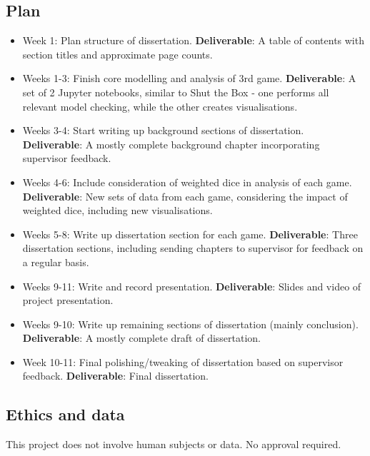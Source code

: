 \documentclass[11pt]{article}
\begin{document}
\subsection{Plan}\label{plan}

\begin{itemize}
    \item Week 1: Plan structure of dissertation. \textbf{Deliverable}: A table of contents with section titles and approximate page counts.
    \item Weeks 1-3: Finish core modelling and analysis of 3rd game. \textbf{Deliverable}: A set of 2 Jupyter notebooks, similar to Shut the Box - one performs all relevant model checking, while the other creates visualisations.
    \item Weeks 3-4: Start writing up background sections of dissertation. \textbf{Deliverable}: A mostly complete background chapter incorporating supervisor feedback.
    \item Weeks 4-6: Include consideration of weighted dice in analysis of each game. \textbf{Deliverable}: New sets of data from each game, considering the impact of weighted dice, including new visualisations.
    \item Weeks 5-8: Write up dissertation section for each game. \textbf{Deliverable}: Three dissertation sections, including sending chapters to supervisor for feedback on a regular basis.
    \item Weeks 9-11: Write and record presentation. \textbf{Deliverable}: Slides and video of project presentation.
    \item Weeks 9-10: Write up remaining sections of dissertation (mainly conclusion). \textbf{Deliverable}: A mostly complete draft of dissertation.
    \item Week 10-11: Final polishing/tweaking of dissertation based on supervisor feedback. \textbf{Deliverable}: Final dissertation.
\end{itemize}

    
\subsection{Ethics and data}\label{ethics}
This project does not involve human subjects or data. No approval required.
\end{document}
